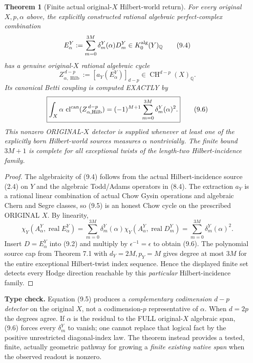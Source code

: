 \documentclass[11pt]{article}
\newcommand{\Q}{\mathbb Q}
\newcommand{\CH}{\operatorname{CH}}
\newcommand{\cl}{\operatorname{cl}}
\newcommand{\Hilb}{\operatorname{Hilb}}
\newtheorem{theorem}{Theorem}[section]
\begin{document}
\begin{theorem}[Finite actual original-\(X\) Hilbert-world return]
For every original \(X,p,\alpha\) above, the explicitly
constructed rational algebraic perfect-complex combination
\[
 E_\alpha^Y
    :=\sum_{m=0}^{3M}\delta_m^Y(\alpha)D_m^Y
            \in K_0^{\rm alg}(Y)_\Q                    \tag{9.4}
\]
has a genuine original-\(X\) rational algebraic cycle
\[
 \boxed{
 Z_{\alpha,\Hilb}^{\,d-p}
      :=\left[a_Y(E_\alpha^Y)\right]_{d-p}
           \in\CH^{d-p}(X)_\Q.}                      \tag{9.5}
\]
Its \emph{canonical} Betti coupling is computed EXACTLY by
\[
 \boxed{
 \int_X\alpha\,
       \cl^{\rm can}(Z_{\alpha,\Hilb}^{\,d-p})
      =(-1)^{M+1}\sum_{m=0}^{3M}
                        \delta_m^Y(\alpha)^2.}      \tag{9.6}
\]
This nonzero ORIGINAL-\(X\) detector is supplied
whenever at least one of the explicitly born Hilbert-world
sources measures \(\alpha\) nontrivially. The finite bound
\(3M+1\) is complete for all exceptional twists of the
length-two Hilbert-incidence family.
\end{theorem}
\begin{proof}
The algebraicity of (9.4) follows from the actual
Hilbert-incidence source (2.4) on \(Y\) and the algebraic
Todd/Adams operators in (8.4). The extraction
\(a_Y\) is a rational linear combination of actual Chow
Gysin operations and algebraic Chern and Segre classes,
so (9.5) is an honest Chow cycle on the prescribed
ORIGINAL \(X\). By linearity,
\[
 \chi_Y(A_\alpha^Y,\operatorname{real}E_\alpha^Y)
   =\sum_{m=0}^{3M}\delta_m^Y(\alpha)
       \chi_Y(A_\alpha^Y,\operatorname{real}D_m^Y)
   =\sum_{m=0}^{3M}\delta_m^Y(\alpha)^2.
\]
Insert \(D=E_\alpha^Y\) into (9.2) and multiply by
\(\epsilon^{-1}=\epsilon\) to obtain (9.6).
The polynomial source cap from Theorem 7.1 with
\(d_Y=2M,p_Y=M\) gives degree at most \(3M\)
for the entire exceptional Hilbert-twist index
sequence. Hence the displayed finite set detects
every Hodge direction reachable by this \emph{particular}
Hilbert-incidence family.
\end{proof}

\noindent\textbf{Type check.} Equation (9.5) produces a
\emph{complementary codimension \(d-p\) detector}
on the original \(X\), not a codimension-\(p\)
representative of \(\alpha\). When \(d=2p\) the
degrees agree. If \(\alpha\) is the residual to the
FULL original-\(X\) algebraic span, (9.6) forces
every \(\delta_m^Y\) to vanish; one cannot replace
that logical fact by the positive unrestricted
diagonal-index law. The theorem instead provides
a tested, finite, actually geometric pathway for
growing a \emph{finite existing native span}
when the observed readout is nonzero.
\end{document}
